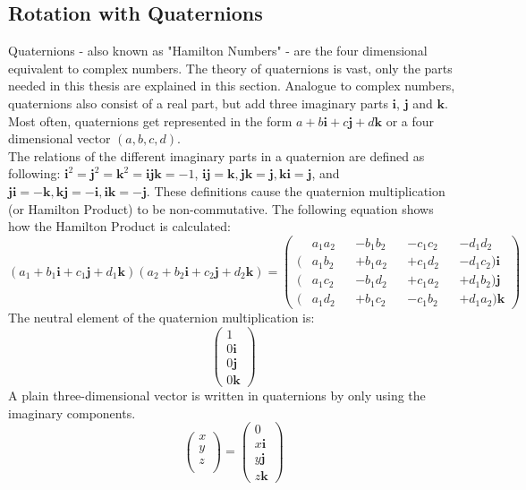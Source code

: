 \subsection{Rotation with Quaternions}
Quaternions - also known as "Hamilton Numbers" - are the four dimensional equivalent to complex numbers. The theory of quaternions is vast, only the parts needed in this thesis are explained in this section. Analogue to complex numbers, quaternions also consist of a real part, but add three imaginary parts $\textbf{i}$, $\textbf{j}$ and $\textbf{k}$. Most often, quaternions get represented in the form $a+b\textbf{i}+c\textbf{j}+d\textbf{k}$ or a four dimensional vector $(a, b, c, d)$.\\
The relations of the different imaginary parts in a quaternion are defined as following: $\textbf{i}^{2}=\textbf{j}^{2}=\textbf{k}^{2}=\textbf{ijk}=-1$, $\textbf{ij}=\textbf{k}, \textbf{jk}=\textbf{j}, \textbf{ki}=\textbf{j}$, and  $\textbf{ji}=-\textbf{k}, \textbf{kj}=-\textbf{i}, \textbf{ik}=-\textbf{j}$. These definitions cause the quaternion multiplication (or Hamilton Product) to be non-commutative. The following equation shows how the Hamilton Product is calculated:
\begin{equation*}
    (a_{1}+b_{1}\textbf{i}+c_{1}\textbf{j}+d_{1}\textbf{k})(a_{2}+b_{2}\textbf{i}+c_{2}\textbf{j}+d_{2}\textbf{k})
    =
    \begin{pmatrix}
          & a_1a_2 &  & - b_1b_2 &  & - c_1c_2 &  & - d_1d_2             \\
        ( & a_1b_2 &  & + b_1a_2 &  & + c_1d_2 &  & - d_1c_2) \textbf{i} \\
        ( & a_1c_2 &  & - b_1d_2 &  & + c_1a_2 &  & + d_1b_2) \textbf{j} \\
        ( & a_1d_2 &  & + b_1c_2 &  & - c_1b_2 &  & + d_1a_2) \textbf{k}
    \end{pmatrix}
\end{equation*}
The neutral element of the quaternion multiplication is:
\begin{equation*}
    \begin{pmatrix}
        1           \\
        0\textbf{i} \\
        0\textbf{j} \\
        0\textbf{k}
    \end{pmatrix}
\end{equation*}
A plain three-dimensional vector is written in quaternions by only using the imaginary components.
\begin{equation*}
    \begin{pmatrix}
        x \\
        y \\
        z \\
    \end{pmatrix}
    =
    \begin{pmatrix}
        0           \\
        x\textbf{i} \\
        y\textbf{j} \\
        z\textbf{k}
    \end{pmatrix}
\end{equation*}
